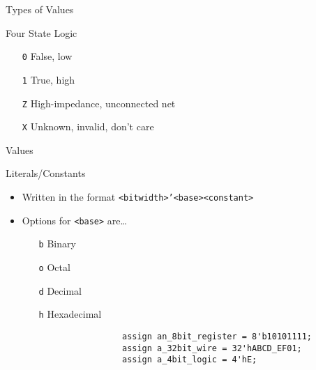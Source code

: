 \documentclass[table,dvipsnames,colorlinks=true]{beamer}
\begin{document}
\begin{frame}{Types of Values}
    \begin{block}{Four State Logic}
        \begin{itemize}
            \item[\texttt{0}] False, low
            \item[\texttt{1}] True, high
            \item[\texttt{Z}] High-impedance, unconnected net
            \item[\texttt{X}] Unknown, invalid, don't care
        \end{itemize}
    \end{block}
\end{frame}

\begin{frame}[fragile]{Values}
    \begin{block}{Literals/Constants}
        \begin{itemize}
            \item Written in the format \texttt{<bitwidth>'<base><constant>}
            \item Options for \texttt{<base>} are\dots
                \begin{itemize}
                    \item[\texttt{b}] Binary
                    \item[\texttt{o}] Octal
                    \item[\texttt{d}] Decimal
                    \item[\texttt{h}] Hexadecimal
                \end{itemize}
                \begin{verbatim}
                    assign an_8bit_register = 8'b10101111;
                    assign a_32bit_wire = 32'hABCD_EF01;
                    assign a_4bit_logic = 4'hE;
                \end{verbatim}
        \end{itemize}
    \end{block}
\end{frame}
\end{document}
